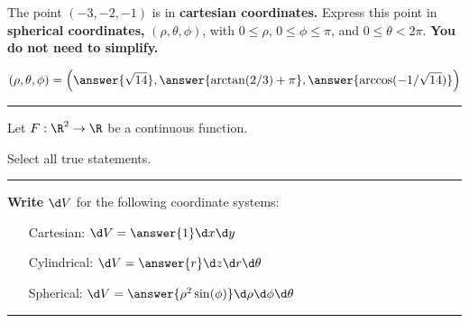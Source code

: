 \documentclass{ximera}
\begin{document}
\begin{problem}
  The point $(-3,-2,-1)$ is in \textbf{cartesian coordinates.} Express
  this point in \textbf{spherical coordinates,} $(\rho,\theta,\phi)$,
  with $0\le \rho$, $0\le \phi \le \pi$, and $0\le \theta<
  2\pi$. \textbf{You do not need to simplify.}
  \begin{prompt}
    \[
    (\rho,\theta,\phi) = \left(\answer{\sqrt{14}},\answer{\arctan(2/3)+\pi},\answer{\arccos(-1/\sqrt{14})}\right)
    \]
  \end{prompt}
\end{problem}

\vfill

\hrule

\begin{problem}
  Let $F:\R^2\to\R$ be a continuous function.
  \begin{prompt}
    Select all true statements.
  \end{prompt}
  \begin{selectAll}
  \end{selectAll}
\end{problem}

\hrule


\begin{problem}
  \textbf{Write} $\d V$ for the following coordinate systems:
  \begin{itemize}
  \item[Cartesian:] $\d V = \answer{1}\d x\d y$
  \item[Cylindrical:] $\d V = \answer{r} \d z \d r \d \theta$
  \item[Spherical:] $\d V = \answer{\rho^2\sin(\phi)} \d \rho \d \phi \d \theta$
  \end{itemize}
\end{problem}

\hrule
\end{document}
